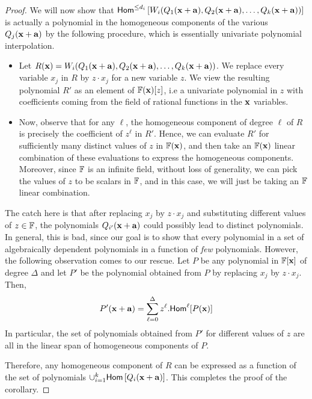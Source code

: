 \begin{proof}
We will now show that $\mathsf{Hom}^{\leq d_{i}}\left[W_{i}(Q_{1}(\mathbf{x} + \mathbf{a}), Q_{2}(\mathbf{x} + \mathbf{a}), \ldots, Q_{k}(\mathbf{x} + \mathbf{a})) \right]$ is actually a polynomial in the homogeneous components of the various $Q_{j}(\mathbf{x} + \mathbf{a})$ by the following procedure, which is essentially univariate polynomial interpolation. 
\begin{itemize}
\item Let $R(\mathbf{x}) = W_{i}(Q_{1}(\mathbf{x} + \mathbf{a}), Q_{2}(\mathbf{x} + \mathbf{a}), \ldots, Q_{k}(\mathbf{x} + \mathbf{a}))$. We replace every variable $x_j$ in $R$ by $z\cdot x_j$ for a new variable $z$. We view the resulting polynomial $R'$ as an element of $\mathbb{F}(\mathbf{x})[z]$, i.e a univariate polynomial in $z$ with coefficients coming from the field of rational functions in the $\mathbf{x}$ variables. 
\item Now, observe that for any $\ell$, the homogeneous component of degree $\ell$ of  $R$ is precisely the coefficient of $z^{\ell}$ in $R'$. Hence, we can evaluate $R'$ for sufficiently many distinct values of $z$ in $\mathbb{F}(\mathbf{x})$, and then take an $\mathbb{F}(\mathbf{x})$ linear combination of these evaluations to express the homogeneous components. Moreover, since $\mathbb{F}$ is an infinite field, without loss of generality, we can pick the values of $z$ to be scalars in $\mathbb{F}$, and in this case, we will just be taking an $\mathbb{F}$ linear combination. 
\end{itemize}
The catch here is that after replacing $x_j$ by $z\cdot x_j$ and substituting different values of $z \in \mathbb{F}$, the polynomials $Q_{i'}(\mathbf{x} + \mathbf{a})$ could possibly lead to distinct polynomials. In general, this is bad, since our goal is to show that every polynomial in a set of algebraically dependent polynomials in a function of \emph{few} polynomials. However, the following observation comes to our rescue. Let $P$ be any polynomial in $\mathbb{F}[\mathbf{x}]$ of degree $\Delta$ and let $P'$ be the polynomial obtained from $P$ by replacing $x_j$ by $z\cdot x_j$. Then, 
\[
P'(\mathbf{x} + \mathbf{a}) = \sum_{\ell = 0}^{\Delta} z^{\ell}.\mathsf{Hom}^{\ell}[P(\mathbf{x})]
\]
In particular, the set of polynomials obtained from $P'$ for different values of $z$ are all in the linear span of homogeneous components of $P$. 

Therefore, any homogeneous component of $R$ can be expressed as a function of the set of polynomials $\cup_{i = 1}^k \mathsf{Hom}\left[Q_i(\mathbf{x} + \mathbf{a}) \right]$. This completes the proof of the corollary. 

\end{proof}




